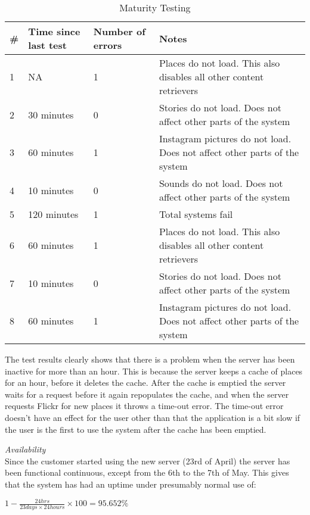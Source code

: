 \begin{table}[!htp]
\begin{center}
	\begin{tabular}{ | l | l | l | p{7cm} | }
	\hline
	\#	&Time since last test &Number of errors	& Notes \\ \hline
	1	&NA			& 1 & Places do not load. This also disables all other content retrievers\\ \hline
	2	&30 minutes		& 0 & Stories do not load. Does not affect other parts of the system\\ \hline
	3	&60 minutes		& 1 & Instagram pictures do not load. Does not affect other parts of the system\\ \hline
	4	&10 minutes		& 0 & Sounds do not load. Does not affect other parts of the system\\ \hline
	5	&120 minutes	& 1 & Total systems fail\\ \hline
	6	&60 minutes		& 1 & Places do not load. This also disables all other content retrievers\\ \hline
	7	&10 minutes		& 0 & Stories do not load. Does not affect other parts of the system\\ \hline
	8	&60 minutes		& 1 & Instagram pictures do not load. Does not affect other parts of the system\\
	 \hline
	 \end{tabular}
\end{center}
\caption{Maturity Testing}
\label{tab:Maturity Testing}
\end{table}

The test results clearly shows that there is a problem when the server has been inactive for more than an hour. This is because the server keeps a cache of places for an hour, before it deletes the cache. After the cache is emptied the server waits for a request before it again repopulates the cache, and when the server requests Flickr for new places it throws a time-out error. The time-out error doesn't have an effect for the user other than that the application is a bit slow if the user is the first to use the system after the cache has been emptied.

\emph{Availability}\\
Since the customer started using the new server (23rd of April) the server has been functional continuous, except from the 6th to the 7th of May. This gives that the system has had an uptime under presumably normal use of:

$1-\frac{24 hrs}{23 days \times 24 hours} \times 100 = 95.652 \% $

